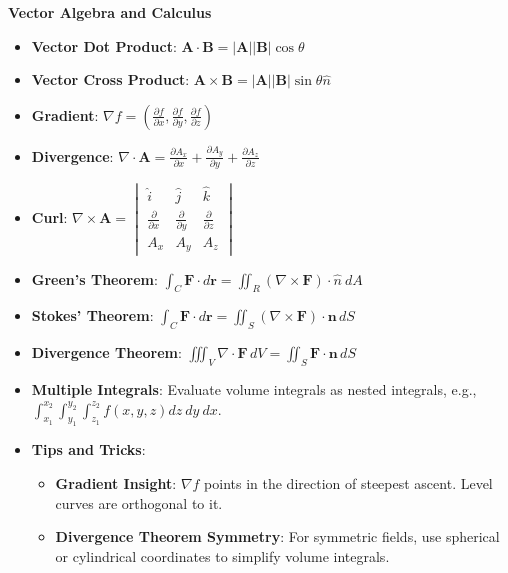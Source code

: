 \documentclass[a4paper,10pt]{article}
\begin{document}
\textbf{Vector Algebra and Calculus}
\begin{itemize}
    \item \textbf{Vector Dot Product}: \( \mathbf{A} \cdot \mathbf{B} = |\mathbf{A}| |\mathbf{B}| \cos\theta \)
    \item \textbf{Vector Cross Product}: \( \mathbf{A} \times \mathbf{B} = |\mathbf{A}| |\mathbf{B}| \sin\theta \hat{n} \)
    \item \textbf{Gradient}: \( \nabla f = \left( \frac{\partial f}{\partial x}, \frac{\partial f}{\partial y}, \frac{\partial f}{\partial z} \right) \)
    \item \textbf{Divergence}: \( \nabla \cdot \mathbf{A} = \frac{\partial A_x}{\partial x} + \frac{\partial A_y}{\partial y} + \frac{\partial A_z}{\partial z} \)
    \item \textbf{Curl}: \( \nabla \times \mathbf{A} = \begin{vmatrix} \hat{i} & \hat{j} & \hat{k} \\
    \frac{\partial}{\partial x} & \frac{\partial}{\partial y} & \frac{\partial}{\partial z} \\
    A_x & A_y & A_z \end{vmatrix} \)
    \item \textbf{Green's Theorem}: \( \int_C \mathbf{F} \cdot d\mathbf{r} = \iint_R (\nabla \times \mathbf{F}) \cdot \hat{n} \ dA \)
    \item \textbf{Stokes' Theorem}: \( \int_C \mathbf{F} \cdot d\mathbf{r} = \iint_S (\nabla \times \mathbf{F}) \cdot \mathbf{n} \, dS \)
    \item \textbf{Divergence Theorem}: \( \iiint_V \nabla \cdot \mathbf{F} \, dV = \iint_S \mathbf{F} \cdot \mathbf{n} \, dS \)
    \item \textbf{Multiple Integrals}: Evaluate volume integrals as nested integrals, e.g., \( \int_{x_1}^{x_2} \int_{y_1}^{y_2} \int_{z_1}^{z_2} f(x,y,z) dz \ dy \ dx \).
    \item \textbf{Tips and Tricks}:
    \begin{itemize}
        \item \textbf{Gradient Insight}: \( \nabla f \) points in the direction of steepest ascent. Level curves are orthogonal to it.
        \item \textbf{Divergence Theorem Symmetry}: For symmetric fields, use spherical or cylindrical coordinates to simplify volume integrals.
    \end{itemize}
\end{itemize}
\end{document}

